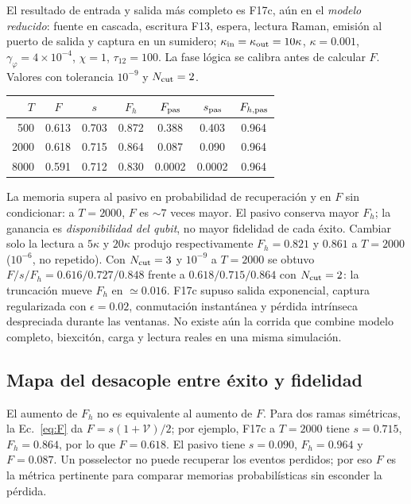 \documentclass[11pt,a4paper]{article}
\newcommand{\gphi}{\gamma_\varphi}
\begin{document}
El resultado de entrada y salida más completo es F17c, aún en el \emph{modelo reducido}:
fuente en cascada, escritura F13, espera, lectura Raman, emisión al puerto de salida
y captura en un sumidero; $\kappa_{\rm in}=\kappa_{\rm out}=10\kappa$,
$\kappa=0.001$, $\gphi=4\times10^{-4}$, $\chi=1$, $\tau_{12}=100$.
La fase lógica se calibra antes de calcular $F$. Valores con tolerancia $10^{-9}$ y $N_{\rm cut}=2$.
\begin{center}\small
\begin{tabular}{rccc ccc}\toprule
$T$ & $F$ & $s$ & $F_h$ & $F_{\rm pas}$ & $s_{\rm pas}$ & $F_{h,\rm pas}$\\\midrule
500  & 0.613 & 0.703 & 0.872 & 0.388 & 0.403 & 0.964\\
2000 & 0.618 & 0.715 & 0.864 & 0.087 & 0.090 & 0.964\\
8000 & 0.591 & 0.712 & 0.830 & 0.0002 & 0.0002 & 0.964\\\bottomrule
\end{tabular}
\end{center}
La memoria supera al pasivo en probabilidad de recuperación y en $F$ sin condicionar:
a $T=2000$, $F$ es $\sim7$ veces mayor. El pasivo conserva mayor $F_h$;
la ganancia es \emph{disponibilidad del qubit}, no mayor fidelidad de cada éxito.
Cambiar solo la lectura a $5\kappa$ y $20\kappa$ produjo respectivamente
$F_h=0.821$ y $0.861$ a $T=2000$ ($10^{-6}$, no repetido). Con $N_{\rm cut}=3$ y $10^{-9}$ a $T=2000$ se obtuvo $F/s/F_h=0.616/0.727/0.848$ frente a $0.618/0.715/0.864$ con $N_{\rm cut}=2$: la truncación mueve $F_h$ en $\simeq0.016$. F17c supuso salida exponencial,
captura regularizada con $\epsilon=0.02$, conmutación instantánea y pérdida
intrínseca despreciada durante las ventanas. No existe aún la corrida que combine
modelo completo, biexcitón, carga y lectura reales en una misma simulación.

\subsection{Mapa del desacople entre éxito y fidelidad}
El aumento de $F_h$ no es equivalente al aumento de $F$. Para dos ramas simétricas,
la Ec.~\eqref{eq:F} da $F=s(1+\mathcal V)/2$; por ejemplo, F17c a $T=2000$
tiene $s=0.715$, $F_h=0.864$, por lo que $F=0.618$.
El pasivo tiene $s=0.090$, $F_h=0.964$ y $F=0.087$.
Un posselector no puede recuperar los eventos perdidos; por eso $F$ es la métrica
pertinente para comparar memorias probabilísticas sin esconder la pérdida.
\end{document}
